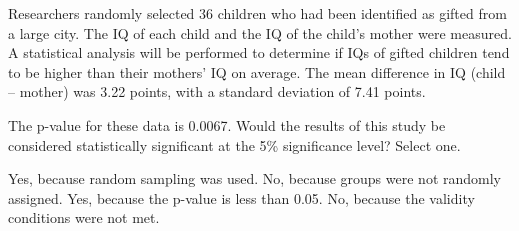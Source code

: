 \documentclass{article}
\begin{document}
\begin{mcquestions}
		\question Researchers randomly selected 36 children who had been identified as gifted from a large city. The IQ of each child and the IQ of the child's mother were measured. A statistical analysis will be performed to determine if IQs of gifted children tend to be higher than their mothers' IQ on average. The mean difference in IQ (child – mother) was 3.22 points, with a standard deviation of 7.41 points.
		
		The p-value for these data is 0.0067. Would the results of this study be considered statistically significant at the 5\% significance level?  Select one. 
		\begin{mcanswerslist}
			\answer Yes, because random sampling was used.
			\answer No, because groups were not randomly assigned.
			\answer[correct] Yes, because the p-value is less than 0.05.
			\answer No, because the validity conditions were not met.
		\end{mcanswerslist}
		
		
	\end{mcquestions}
\end{document}
